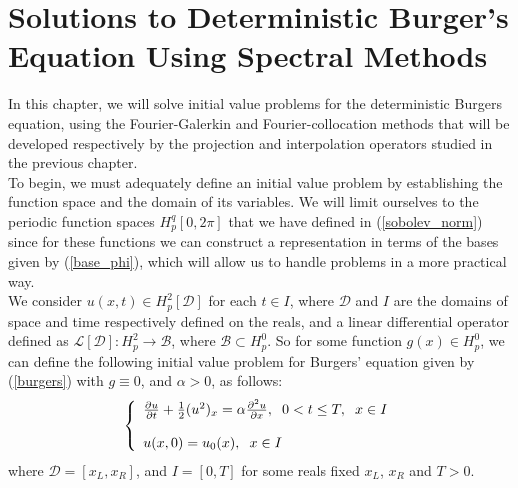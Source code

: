 \chapter{Solutions to Deterministic Burger's Equation Using Spectral Methods}
\label{Chapter_3} 
	
	In this chapter, we will solve initial value problems for the deterministic Burgers equation, using the Fourier-Galerkin and Fourier-collocation methods that will be developed respectively by the projection and interpolation operators studied in the previous chapter. \\     
	
	To begin, we must adequately define an initial value problem by establishing the function space and the domain of its variables. We will limit ourselves to the periodic function spaces $H^q_p [0, 2 \pi]$ that we have defined in (\ref{sobolev_norm}) since for these functions we can construct a representation in terms of the bases given by (\ref{base_phi}), which will allow us to handle problems in a more practical way. \\
	
	We consider $u(x, t) \in H^2_p [\mathcal {D}]$ for each $t \in I $, where $\mathcal{D} $ and $I$ are the domains of space and time respectively defined on the reals, and a linear differential operator defined as $\mathcal{L} [\mathcal{D}]: H^2_p \rightarrow \mathcal{B}$, where $\mathcal{B} \subset H^0_p$. So for some function $g(x) \in H^0_p$, we can define the following initial value problem for Burgers' equation given by (\ref{burgers}) with $g \equiv 0$, and $\alpha>0$, as follows: 
	\begin{align}
		\label{IVP_burgers}
		\left \lbrace \begin{array}{ll}
			\frac{\partial u}{\partial t} + \frac{1}{2} (u^2)_x = \alpha \frac{\partial^2 u}{\partial x}, \hspace{2mm} 0 < t \leq T, \hspace{2mm} x \in I \\
			\\
			u(x, 0) = u_0(x), \hspace{2mm} x \in I
		\end{array}  \right .
	\end{align}
	where $\mathcal{D} = [x_L, x_R]$, and $I = [0, T]$ for some reals fixed $x_L$, $x_R$ and $T> 0$. \\
	 

